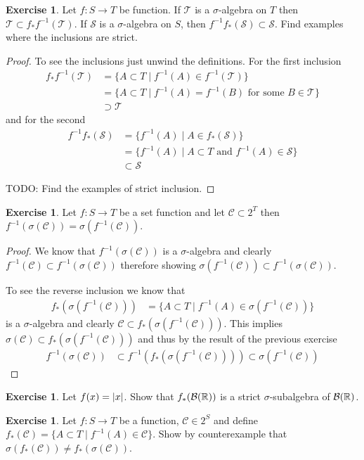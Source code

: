 \documentclass{amsart}
\theoremstyle{remark}
\theoremstyle{definition}
\newtheorem{ex}[thm]{Exercise}
\begin{document}
\begin{ex}Let $f : S \to T$ be function.  If $\mathcal{T}$ is a
  $\sigma$-algebra on $T$ then $\mathcal{T} \subset f_*
  f^{-1}(\mathcal{T})$.  If $\mathcal{S}$ is a $\sigma$-algebra on
  $S$, then $f^{-1}f_*(\mathcal{S}) \subset \mathcal{S}$.  Find examples where the inclusions are strict.
\end{ex}
\begin{proof}
To see the inclusions just unwind the definitions.  For the first inclusion
\begin{align*}
f_* f^{-1}(\mathcal{T}) &= \lbrace A \subset T \mid f^{-1}(A) \in
f^{-1}(\mathcal{T}) \rbrace \\
&= \lbrace A \subset T \mid f^{-1}(A) =
f^{-1}(B) \text { for some } B \in \mathcal{T} \rbrace \\
&\supset \mathcal{T}
\end{align*}
and for the second
\begin{align*}
f^{-1} f_* (\mathcal{S}) &= \lbrace f^{-1}(A) \mid A \in  f_*
(\mathcal{S}) \rbrace \\
&= \lbrace f^{-1}(A) \mid A \subset T \text{ and } f^{-1}(A) \in
\mathcal{S} \rbrace \\
&\subset \mathcal{S}
\end{align*}

TODO: Find the examples of strict inclusion.
\end{proof}
\begin{ex}Let $f : S \to T$ be a set function and let $\mathcal{C}
  \subset 2^T$ then $f^{-1}(\sigma(\mathcal{C})) = \sigma(f^{-1}(\mathcal{C}))$.
\end{ex}
\begin{proof}
We know that $f^{-1}(\sigma(\mathcal{C}))$ is a $\sigma$-algebra and
clearly $f^{-1}(\mathcal{C}) \subset f^{-1}(\sigma(\mathcal{C}))$
therefore showing $\sigma(f^{-1}(\mathcal{C})) \subset
f^{-1}(\sigma(\mathcal{C}))$.  

To see the reverse inclusion we know that 
\begin{align*}
f_* (\sigma(f^{-1}(\mathcal{C}))) &= \lbrace A \subset T \mid
f^{-1}(A) \in \sigma(f^{-1}(\mathcal{C})) \rbrace
\end{align*}
is a $\sigma$-algebra and clearly $\mathcal{C} \subset f_*
(\sigma(f^{-1}(\mathcal{C})))$.  This implies $\sigma(\mathcal{C}) \subset f_*
(\sigma(f^{-1}(\mathcal{C})))$ and thus by the result of the previous
exercise
\begin{align*}
f^{-1}(\sigma(\mathcal{C})) &\subset 
f^{-1} (f_*(\sigma(f^{-1}(\mathcal{C})))) \subset \sigma(f^{-1}(\mathcal{C}))
\end{align*}
\end{proof}
\begin{ex}Let $f(x) = \left \vert x \right \vert$.  Show that $f_*(\mathcal{B}(\mathbb{R}))$
  is a strict $\sigma$-subalgebra of $\mathcal{B}(\mathbb{R})$.
\end{ex}
\begin{ex}Let $f : S \to T$ be a function, $\mathcal{C} \in
  2^S$ and define $f_*(\mathcal{C}) =  \{A \subset T \mid
    f^{-1}(A) \in \mathcal{C} \}$.  Show by counterexample that
    $\sigma(f_*(\mathcal{C})) \neq f_*(\sigma(\mathcal{C}))$.
\end{ex}
\end{document}
